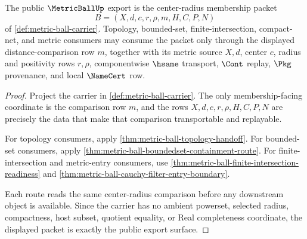 \begin{theorem}
\label{thm:metricball-public-export}
The public $\MetricBallUp$ export is the center-radius membership packet
$$
B=(X,d,c,r,\rho,m,H,C,P,N)
$$
of \autoref{def:metric-ball-carrier}. Topology, bounded-set, finite-intersection, compact-net, and metric consumers may consume the packet only through the displayed distance-comparison row $m$, together with its metric source $X,d$, center $c$, radius and positivity rows $r,\rho$, componentwise $\hsame$ transport, $\Cont$ replay, $\Pkg$ provenance, and local $\NameCert$ row.
\end{theorem}
\begin{proof}
Project the carrier in \autoref{def:metric-ball-carrier}. The only membership-facing coordinate is the comparison row $m$, and the rows $X,d,c,r,\rho,H,C,P,N$ are precisely the data that make that comparison transportable and replayable.

For topology consumers, apply \autoref{thm:metric-ball-topology-handoff}. For bounded-set consumers, apply \autoref{thm:metric-ball-boundedset-containment-route}. For finite-intersection and metric-entry consumers, use \autoref{thm:metric-ball-finite-intersection-readiness} and \autoref{thm:metric-ball-cauchy-filter-entry-boundary}.

Each route reads the same center-radius comparison before any downstream object is available. Since the carrier has no ambient powerset, selected radius, compactness, host subset, quotient equality, or Real completeness coordinate, the displayed packet is exactly the public export surface.
\end{proof}

\begin{closurestatus}{\MetricBallUp}
  \theoryclosure{\matureClosure}
  \formalstatus{\unformalizedV}
\end{closurestatus}
